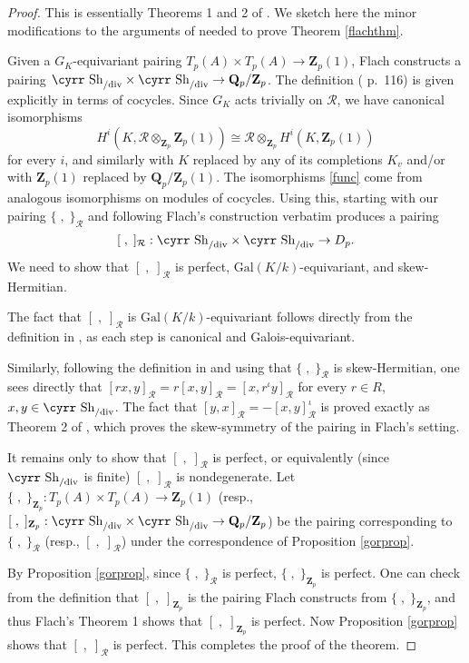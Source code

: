 \documentclass[reqno]{amsart}
\theoremstyle{definition}
\def\Sh{\mbox{\cyrr Sh}}
\def\Z{\mathbf{Z}}
\def\Q{\mathbf{Q}}
\def\Zp{\Z_p}
\def\Qp{\Q_p}
\def\cR{\mathcal{R}}
\def\Gal{\mathrm{Gal}}
\def\div{\mathrm{div}}
\def\Shmd{\Sh_{/\div}}
\def\k{k}
\def\Dp{D_p}
\def\spair#1#2{[#1,#2]}
\def\bpair#1#2{\{#1,#2\}}
\begin{document}
\begin{proof}
This is essentially Theorems 1 and 2 of \cite{flach}.  
We sketch here the minor modifications to the arguments of \cite{flach} needed to 
prove Theorem \ref{flachthm}.

Given a $G_K$-equivariant pairing 
$T_p(A) \times T_p(A) \to \Zp(1)$, Flach constructs a pairing 
$\Shmd \times \Shmd \to \Qp/\Zp$.  The definition (\cite{flach} p.\ 116) 
is given explicitly in terms of cocycles.  Since 
$G_K$ acts trivially on $\cR$, we have canonical isomorphisms 
\begin{equation}
\label{func}
H^i(K, \cR \otimes_{\Zp} \Zp(1)) \cong \cR \otimes_{\Zp} H^i(K,\Zp(1))
\end{equation}
for every $i$, and similarly with $K$ replaced by any of its completions $K_v$ 
and/or with $\Zp(1)$ replaced by $\Qp/\Zp(1)$.  
The isomorphisms \eqref{func} come from analogous isomorphisms on modules 
of cocycles.
Using this, starting with our pairing $\bpair{\;}{\;}_\cR$ and 
following Flach's construction verbatim produces a pairing 
$$
\spair{\;}{\;}_\cR : \Shmd \times \Shmd \to \Dp.
$$  
We need to show that 
$\spair{\;}{\;}_\cR$ is perfect, $\Gal(K/\k)$-equivariant, and skew-Hermitian.

The fact that $\spair{\;}{\;}_\cR$ is $\Gal(K/\k)$-equivariant 
follows directly from the definition in \cite{flach}, 
as each step is canonical and Galois-equivariant.

Similarly, following the definition in \cite{flach} and using that 
$\bpair{\;}{\;}_\cR$ is skew-Hermitian, one sees directly 
that $\spair{rx}{y}_\cR = r\spair{x}{y}_\cR = \spair{x}{r^\iota y}_\cR$ 
for every $r \in R$, $x,y \in \Shmd$. 
The fact that $\spair{y}{x}_\cR = -\spair{x}{y}_\cR^\iota$ is proved exactly as 
Theorem 2 of \cite{flach}, which proves the skew-symmetry of the pairing 
in Flach's setting.

It remains only to show that $\spair{\;}{\;}_\cR$ is perfect, or equivalently 
(since $\Shmd$ is finite) $\spair{\;}{\;}_\cR$ is nondegenerate.  
Let $\bpair{\;}{\;}_{\Zp} : T_p(A) \times T_p(A) \to \Zp(1)$ 
(resp., $\spair{\;}{\;}_{\Zp} : \Shmd \times \Shmd \to \Qp/\Zp$) be the pairing 
corresponding to $\bpair{\;}{\;}_\cR$ (resp., $\spair{\;}{\;}_\cR$) 
under the correspondence of Proposition \ref{gorprop}.  

By Proposition \ref{gorprop}, since $\bpair{\;}{\;}_\cR$ is perfect, 
$\bpair{\;}{\;}_{\Zp}$ is perfect.  
One can check from the definition that $\spair{\;}{\;}_{\Zp}$ is the pairing 
Flach constructs from $\bpair{\;}{\;}_{\Zp}$, and thus Flach's Theorem 1 
shows that $\spair{\;}{\;}_{\Zp}$ is perfect.  Now Proposition \ref{gorprop}
shows that $\spair{\;}{\;}_\cR$ is perfect.
This completes the proof of the theorem.
\end{proof}
\end{document}
